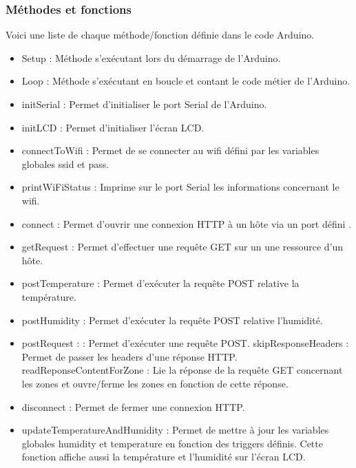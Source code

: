 \subsubsection{Méthodes et fonctions}
Voici une liste de chaque méthode/fonction définie dans le code Arduino. 
\begin{itemize}
\item Setup : Méthode s’exécutant lors du démarrage de l’Arduino.
\item Loop : Méthode s’exécutant en boucle et contant le code métier de l’Arduino.
\item initSerial :  Permet d’initialiser le port Serial de l’Arduino.
\item initLCD :   Permet d’initialiser l’écran LCD.
\item connectToWifi : Permet de se connecter au wifi défini par les variables globales ssid et pass.
\item printWiFiStatus : Imprime sur le port Serial les informations concernant le wifi. 
\item connect : Permet d’ouvrir une connexion HTTP à un hôte via un port défini  .
\item getRequest : Permet d’effectuer une requête GET sur un une ressource d’un hôte. 
\item postTemperature : Permet d’exécuter la requête POST relative la température.
\item postHumidity : Permet d’exécuter la requête POST relative l’humidité.
\item postRequest : : Permet d’exécuter une requête POST.
skipResponseHeaders : Permet de passer les headers d’une réponse HTTP.
readReponseContentForZone : Lie la réponse de la requête GET concernant les zones et ouvre/ferme les zones en fonction de cette réponse.
\item disconnect : Permet de fermer une connexion HTTP.
\item updateTemperatureAndHumidity : Permet de mettre à jour les variables globales humidity et temperature en fonction des triggers définis. Cette fonction affiche aussi la température et l’humidité sur l’écran LCD.
\end{itemize}
